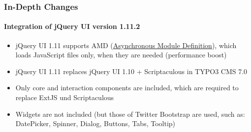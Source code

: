 %

\begin{frame}[fragile]
	\frametitle{In-Depth Changes}
	\framesubtitle{Integration of jQuery UI version 1.11.2}

	\begin{itemize}
		\item jQuery UI 1.11 supports AMD
			(\href{http://en.wikipedia.org/wiki/Asynchronous_module_definition}{Asynchronous Module Definition}),
			which loads JavaScript files only, when they are needed (performance boost)

    	\item jQuery UI 1.11 replaces jQuery UI 1.10 + Scriptaculous in TYPO3 CMS 7.0

    	\item Only core and interaction components are included, which are required
    		to replace ExtJS und Scriptaculous

    	\item Widgets are not included (but those of Twitter Bootstrap are used,
    		such as: DatePicker, Spinner, Dialog, Buttons, Tabs, Tooltip)

	\end{itemize}

\end{frame}


